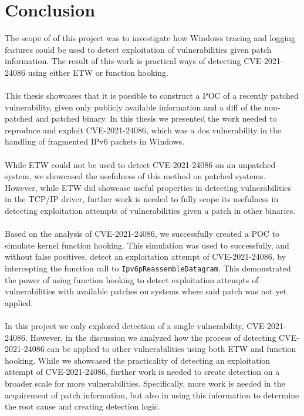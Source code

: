 \documentclass{report}
\begin{document}
\chapter{Conclusion}
The scope of of this project was to investigate how Windows tracing and logging features could be used to detect exploitation of vulnerabilities given patch information. The result of this work is practical ways of detecting CVE-2021-24086 using either \gls{ETW} or function hooking.
\\
\\
This thesis showcases that it is possible to construct a \gls{POC} of a recently patched vulnerability, given only publicly available information and a diff of the non-patched and patched binary. In this thesis we presented the work needed to reproduce and exploit CVE-2021-24086, which was a \gls{dos} vulnerability in the handling of fragmented IPv6 packets in Windows.
\\
\\
While \gls{ETW} could not be used to detect CVE-2021-24086 on an unpatched system, we showcased the usefulness of this method on patched systems. However, while \gls{ETW} did showcase useful properties in detecting vulnerabilities in the TCP/IP driver, further work is needed to fully scope its usefulness in detecting exploitation attempts of vulnerabilities given a patch in other binaries.
\\
\\
Based on the analysis of CVE-2021-24086, we successfully created a \gls{POC} to simulate kernel function hooking. This simulation was used to successfully, and without false positives, detect an exploitation attempt of CVE-2021-24086, by intercepting the function call to \texttt{Ipv6pReassembleDatagram}. This demonstrated the power of using function hooking to detect exploitation attempts of vulnerabilities with available patches on systems where said patch was not yet applied.
\\
\\
In this project we only explored detection of a single vulnerability, CVE-2021-24086. However, in the discussion we analyzed how the process of detecting CVE-2021-24086 can be applied to other vulnerabilities using both \gls{ETW} and function hooking. While we showcased the practicality of detecting an exploitation attempt of CVE-2021-24086, further work is needed to create detection on a broader scale for more vulnerabilities. Specifically, more work is needed in the acquirement of patch information, but also in using this information to determine the root cause and creating detection logic.
\end{document}
